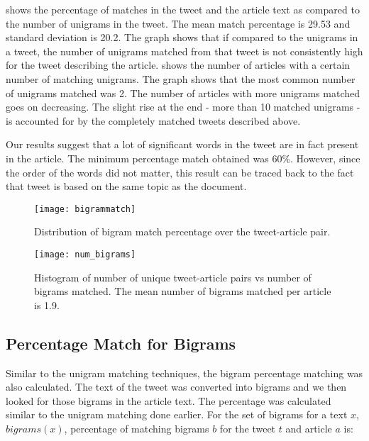  shows the percentage of matches in the tweet and the article text as compared to the number of unigrams in the tweet. The mean match percentage is 29.53 and standard deviation is 20.2. The graph shows that if compared to the unigrams in a tweet, the number of unigrams matched from that tweet is not consistently high for the tweet describing the article.  shows the number of articles with a certain number of matching unigrams. The graph shows that the most common number of unigrams matched was 2. The number of articles with more unigrams matched goes on decreasing. The slight rise at the end - more than 10 matched unigrams - is accounted for by the completely matched tweets described above. 

Our results suggest that a lot of significant words in the tweet are in fact present in the article. The minimum percentage match obtained was 60\%. However, since the order of the words did not matter, this result can  be traced back to the fact that tweet is based on the same topic as the document. 

\begin{figure}[tbp]
\centering
\texttt{[image: bigrammatch]}
\caption{Distribution of bigram match percentage over the tweet-article pair.}
\label{fig:bigrammatch}
\end{figure}

\begin{figure}[tbp]
\centering
\texttt{[image: num\_bigrams]}
\caption{Histogram of number of unique tweet-article pairs vs number of bigrams matched. The mean number of bigrams matched per article is 1.9.}
\label{fig:num_bigrams}
\end{figure}


\subsection{Percentage Match for Bigrams}
\label{sec:bigrams}

Similar to the unigram matching techniques, the bigram percentage matching was also calculated. The text of the tweet was converted into bigrams and we then looked for those bigrams in the article text. The percentage was calculated similar to the unigram matching done earlier. For the set of bigrams for a text $x$, $\textit{bigrams}(x)$, percentage of matching bigrams $b$ for the tweet $t$ and article $a$ is: 

